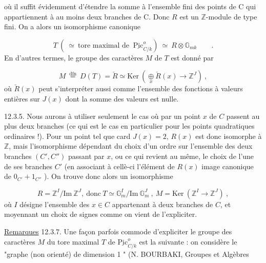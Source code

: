 
où il suffit évidemment d'étendre la somme à l'ensemble fini des points de C qui appartiennent à au moins deux branches de C. Donc $R$ est un $\mathbb{Z}$-module de type fini. On a alors un isomorphisme canonique

\begin{equation}\tag{12.2.3}
T\ (\ \simeq\ \mbox{tore maximal de }\ \underline{\mathrm{Pic}}^{o}_{C/k})\ \simeq\ R \otimes \mathbb{G}_{mk}\qquad .
\end{equation}
En d'autres termes, le groupe des caractères $M$ de $T$ est donné par

\begin{equation}\tag{12.2.4}
M\ \stackrel{\mathrm{dfn}}{=}\ D(T) = \check{R} \simeq \mathrm{Ker}\ (\mathop{\oplus}\limits_{x} \check{R}(x) \longrightarrow \mathbb{Z}^{J})\ ,
\end{equation}
où $\check{R}(x)$ peut s'interpréter aussi comme l'ensemble des fonctions à valeurs entières sur $J(x)$ dont la somme des valeurs est nulle.

12.3.5. Nous aurons à utiliser seulement le cas où par un point $x$ de $C$ passent au plus deux branches (ce qui est le cas en particulier pour les points quadratiques ordinaires !). Pour un point tel que card $J(x) = 2$, $R(x)$ est donc isomorphe à $\mathbb{Z}$, mais l'isomorphisme dépendant du choix d'un ordre sur l'ensemble des deux branches $(C',C'')$ passant par $x$, ou ce qui revient au même, le choix de l'une de ses branches $C'$ (en associant à cellè-ci l'élément de $R(x)$ image canonique de $0_{C'} + 1_{C''}$ ). On trouve donc alors un isomorphisme

\begin{equation}\tag{12.3.6}
R = \mathbb{Z}^{I}/\mathrm{Im}\ \mathbb{Z}^{J},\ \mbox{donc}\ T \simeq \mathbb{G}_{m}^{I}/\mathrm{Im}\ \mathbb{G}_{m}^{J}\ ,\ M = \mathrm{Ker}\ (\mathbb{Z}^{I} \longrightarrow \mathbb{Z}^{J})\ ,
\end{equation}
où $I$ désigne l'ensemble des $x \in C$ appartenant à deux branches de $C$, et moyennant un choix de signes comme on vient de l'expliciter.

\underline{Remarques} 12.3.7. Une façon parfois commode d'expliciter le groupe des caractères $M$ du tore maximal $T$ de $\underline{\mathrm{Pic}}^{o}_{C/k}$ est la suivante : on considère le "graphe (non orienté) de dimension 1 " (N. BOURBAKI, Groupes et Algèbres



